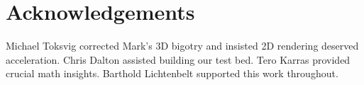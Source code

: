 
\section*{Acknowledgements}

Michael Toksvig corrected Mark's 3D bigotry and insisted 2D rendering deserved acceleration.
Chris Dalton assisted building our test bed.
Tero Karras provided crucial math insights.
Barthold Lichtenbelt supported this work throughout.
